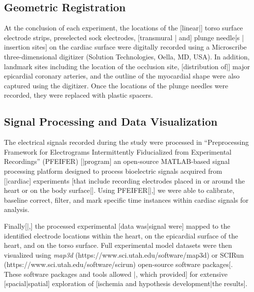 \documentclass[twocolumn]{cinc}
\newcommand{\mapthreed}{\textit{map3d }}
\begin{document}
\subsection{Geometric Registration}


At the conclusion of each experiment, the locations of the [linear|] torso
surface electrode strips, preselected sock electrodes, [transmural | and]
plunge needle[s | insertion sites] on the cardiac surface were digitally
recorded using a Microscribe three-dimensional digitizer (Solution
Technologies, Oella, MD, USA). In addition, landmark sites including the
location of the occlusion site, [distribution of|] major epicardial
coronary arteries, and the outline of the myocardial shape were also
captured using the digitizer. Once the locations of the plunge needles were
recorded, they were replaced with plastic spacers.


\subsection{Signal Processing and Data Visualization}

The electrical signals recorded during the study were processed in
``Preprocessing Framework for Electrograms Intermittently Fiducialized from
Experimental Recordings'' (PFEIFER) [|program] an open-source MATLAB-based
signal processing platform designed to process bioelectric signals acquired
from [|cardiac] experiments [that include recording electrodes placed in or
around the heart or on the body surface|]. \cite{Rodenhauser2018} Using
PFEIFER[|,] we were able to calibrate, baseline correct, filter, and mark
specific time instances within cardiac signals for analysis.

Finally[|,] the processed experimental [data was|signal were] mapped to the
identified electrode locations within the heart, on the epicardial surface
of the heart, and on the torso surface. Full experimental model datasets
were then visualized using \mapthreed
(https://www.sci.utah.edu/software/map3d) or SCIRun
(https://www.sci.utah.edu/software/scirun) open-source software
packages[. These software packages and tools allowed |, which provided] for
extensive [spacial|spatial] exploration of [ischemia and hypothesis
development|the results].
\end{document}
